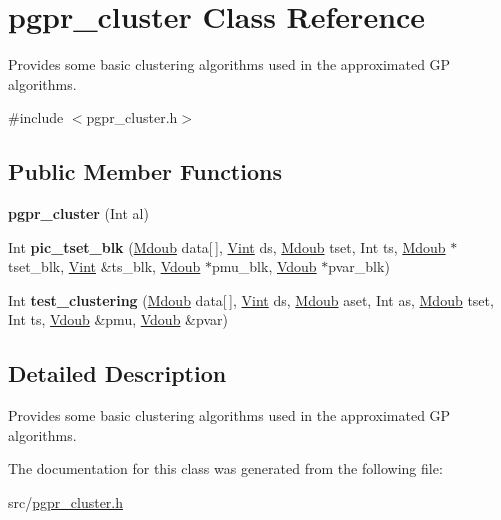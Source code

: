 \hypertarget{classpgpr__cluster}{\section{pgpr\+\_\+cluster Class Reference}
\label{classpgpr__cluster}
}


Provides some basic clustering algorithms used in the approximated G\+P algorithms.  




{\ttfamily \#include $<$pgpr\+\_\+cluster.\+h$>$}

\subsection*{Public Member Functions}
\begin{DoxyCompactItemize}
\item 
\hypertarget{classpgpr__cluster_abcc2777420420d1773d094ad9b5212b8}{{\bfseries pgpr\+\_\+cluster} (Int al)}\label{classpgpr__cluster_abcc2777420420d1773d094ad9b5212b8}

\item 
\hypertarget{classpgpr__cluster_aeceb942904a50b4b42942b012ec80e47}{Int {\bfseries pic\+\_\+tset\+\_\+blk} (\hyperlink{classpgpr__matrix}{Mdoub} data\mbox{[}$\,$\mbox{]}, \hyperlink{classpgpr__vector}{Vint} ds, \hyperlink{classpgpr__matrix}{Mdoub} tset, Int ts, \hyperlink{classpgpr__matrix}{Mdoub} $\ast$tset\+\_\+blk, \hyperlink{classpgpr__vector}{Vint} \&ts\+\_\+blk, \hyperlink{classpgpr__vector}{Vdoub} $\ast$pmu\+\_\+blk, \hyperlink{classpgpr__vector}{Vdoub} $\ast$pvar\+\_\+blk)}\label{classpgpr__cluster_aeceb942904a50b4b42942b012ec80e47}

\item 
\hypertarget{classpgpr__cluster_a0aa879c1cb4267c7a6632e9c21f4c5bd}{Int {\bfseries test\+\_\+clustering} (\hyperlink{classpgpr__matrix}{Mdoub} data\mbox{[}$\,$\mbox{]}, \hyperlink{classpgpr__vector}{Vint} ds, \hyperlink{classpgpr__matrix}{Mdoub} aset, Int as, \hyperlink{classpgpr__matrix}{Mdoub} tset, Int ts, \hyperlink{classpgpr__vector}{Vdoub} \&pmu, \hyperlink{classpgpr__vector}{Vdoub} \&pvar)}\label{classpgpr__cluster_a0aa879c1cb4267c7a6632e9c21f4c5bd}

\end{DoxyCompactItemize}


\subsection{Detailed Description}
Provides some basic clustering algorithms used in the approximated G\+P algorithms. 

The documentation for this class was generated from the following file\+:\begin{DoxyCompactItemize}
\item 
src/\hyperlink{pgpr__cluster_8h}{pgpr\+\_\+cluster.\+h}\end{DoxyCompactItemize}
